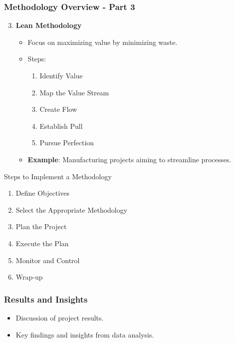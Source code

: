 \documentclass[aspectratio=169]{beamer}
\begin{document}
\begin{frame}[fragile]
    \frametitle{Methodology Overview - Part 3}
    \begin{enumerate}
        \setcounter{enumi}{2}
        \item \textbf{Lean Methodology}
            \begin{itemize}
                \item Focus on maximizing value by minimizing waste.
                \item Steps:
                    \begin{enumerate}
                        \item Identify Value
                        \item Map the Value Stream
                        \item Create Flow
                        \item Establish Pull
                        \item Pursue Perfection
                    \end{enumerate}
                \item \textbf{Example}: Manufacturing projects aiming to streamline processes.
            \end{itemize}
    \end{enumerate}

    \begin{block}{Steps to Implement a Methodology}
        \begin{enumerate}
            \item Define Objectives
            \item Select the Appropriate Methodology
            \item Plan the Project
            \item Execute the Plan
            \item Monitor and Control
            \item Wrap-up
        \end{enumerate}
    \end{block}
\end{frame}

\begin{frame}
    \frametitle{Results and Insights}
    \begin{itemize}
        \item Discussion of project results.
        \item Key findings and insights from data analysis.
    \end{itemize}
\end{frame}
\end{document}
